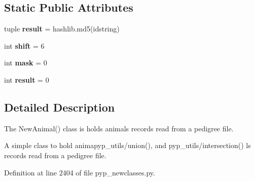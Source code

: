 \subsection*{Static Public Attributes}
\begin{DoxyCompactItemize}
\item 
\hypertarget{classPyPedal_1_1pyp__newclasses_1_1NewAnimal_a64adf06733cee5d501e3683664884f98}{
tuple {\bfseries result} = hashlib.md5(idstring)}
\label{classPyPedal_1_1pyp__newclasses_1_1NewAnimal_a64adf06733cee5d501e3683664884f98}

\item 
\hypertarget{classPyPedal_1_1pyp__newclasses_1_1NewAnimal_a5784e4a41e1abb82304713d326ff1d6c}{
int {\bfseries shift} = 6}
\label{classPyPedal_1_1pyp__newclasses_1_1NewAnimal_a5784e4a41e1abb82304713d326ff1d6c}

\item 
\hypertarget{classPyPedal_1_1pyp__newclasses_1_1NewAnimal_a2ee518d81a33e2a88211ea2b014f4c43}{
int {\bfseries mask} = 0}
\label{classPyPedal_1_1pyp__newclasses_1_1NewAnimal_a2ee518d81a33e2a88211ea2b014f4c43}

\item 
\hypertarget{classPyPedal_1_1pyp__newclasses_1_1NewAnimal_ac6426c67cbb389f5f57bc5366a354fa5}{
int {\bfseries result} = 0}
\label{classPyPedal_1_1pyp__newclasses_1_1NewAnimal_ac6426c67cbb389f5f57bc5366a354fa5}

\end{DoxyCompactItemize}


\subsection{Detailed Description}
The NewAnimal() class is holds animals records read from a pedigree file. 

\begin{DoxyVerb}A simple class to hold animapyp_utils/union(), and pyp_utils/intersection() ls records read from a pedigree file.\end{DoxyVerb}
 

Definition at line 2404 of file pyp\_\-newclasses.py.



